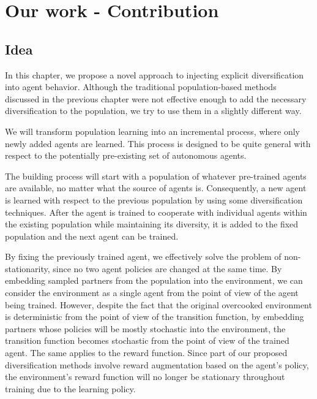 \chapter{Our work - Contribution}

\section{Idea}
In this chapter, we propose a novel approach to injecting explicit diversification into agent behavior.
Although the traditional population-based methods discussed in the previous chapter were not effective enough to add the necessary diversification to the population, we try to use them in a slightly different way.

We will transform population learning into an incremental process, where only newly added agents are learned.
This process is designed to be quite general with respect to the potentially pre-existing set of autonomous agents.

The building process will start with a population of whatever pre-trained agents are available, no matter what the source of agents is.
Consequently, a new agent is learned with respect to the previous population by using some diversification techniques.
After the agent is trained to cooperate with individual agents within the existing population while maintaining its diversity, it is added to the fixed population and the next agent can be trained.

By fixing the previously trained agent, we effectively solve the problem of non-stationarity, since no two agent policies are changed at the same time.
By embedding sampled partners from the population into the environment, we can consider the environment as a single agent from the point of view of the agent being trained.
However, despite the fact that the original overcooked environment is deterministic from the point of view of the transition function, by embedding partners whose policies will be mostly stochastic into the environment, the transition function becomes stochastic from the point of view of the trained agent.
The same applies to the reward function.
Since part of our proposed diversification methods involve reward augmentation based on the agent's policy, the environment's reward function will no longer be stationary throughout training due to the learning policy.

